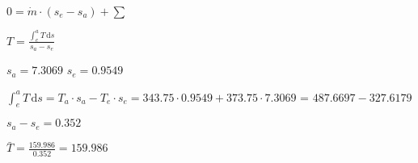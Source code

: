 \( 0 = \dot{m} \cdot (s_e - s_a) + \sum \)  

\( T = \frac{\int_e^a T \, \text{d}s}{s_a - s_e} \)  

\( s_a = 7.3069 \)  
\( s_e = 0.9549 \)  

\( \int_e^a T \, \text{d}s = T_a \cdot s_a - T_e \cdot s_e = 343.75 \cdot 0.9549 + 373.75 \cdot 7.3069 \)  
= \( 487.6697 - 327.6179 \)  

\( s_a - s_e = 0.352 \)  

\( \bar{T} = \frac{159.986}{0.352} = 159.986 \)
